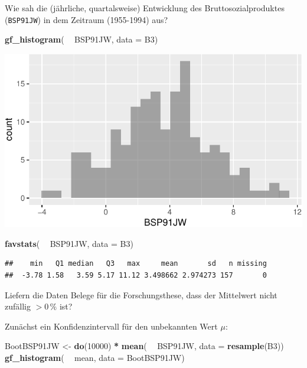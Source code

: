 \documentclass[12pt,ngerman,paper=a4,pagesize,DIV=13]{scrreprt}
\newenvironment{Shaded}{\begin{snugshade}}{\end{snugshade}}
\newcommand{\DataTypeTok}[1]{\textcolor[rgb]{0.13,0.29,0.53}{#1}}
\newcommand{\DecValTok}[1]{\textcolor[rgb]{0.00,0.00,0.81}{#1}}
\newcommand{\KeywordTok}[1]{\textcolor[rgb]{0.13,0.29,0.53}{\textbf{#1}}}
\newcommand{\NormalTok}[1]{#1}
\newcommand{\OperatorTok}[1]{\textcolor[rgb]{0.81,0.36,0.00}{\textbf{#1}}}
\newcommand{\StringTok}[1]{\textcolor[rgb]{0.31,0.60,0.02}{#1}}
\begin{document}
Wie sah die (jährliche, quartalsweise) Entwicklung des
Bruttosozialproduktes (\texttt{BSP91JW}) in dem Zeitraum (1955-1994)
aus?

\begin{Shaded}
\begin{Highlighting}[]
\KeywordTok{gf_histogram}\NormalTok{( }\OperatorTok{~}\StringTok{ }\NormalTok{BSP91JW, }\DataTypeTok{data =}\NormalTok{ B3)}
\end{Highlighting}
\end{Shaded}

\includegraphics{DatenerhebungStatistik-Uebung_files/figure-latex/unnamed-chunk-123-1.pdf}

\begin{Shaded}
\begin{Highlighting}[]
\KeywordTok{favstats}\NormalTok{( }\OperatorTok{~}\StringTok{ }\NormalTok{BSP91JW, }\DataTypeTok{data =}\NormalTok{ B3)}
\end{Highlighting}
\end{Shaded}

\begin{verbatim}
##    min   Q1 median   Q3   max     mean       sd   n missing
##  -3.78 1.58   3.59 5.17 11.12 3.498662 2.974273 157       0
\end{verbatim}

Liefern die Daten Belege für die Forschungsthese, dass der Mittelwert
nicht zufällig \(> 0\,\%\) ist?

Zunächst ein Konfidenzintervall für den unbekannten Wert \(\mu\):

\begin{Shaded}
\begin{Highlighting}[]
\NormalTok{BootBSP91JW <-}\StringTok{ }\KeywordTok{do}\NormalTok{(}\DecValTok{10000}\NormalTok{) }\OperatorTok{*}\StringTok{ }\KeywordTok{mean}\NormalTok{( }\OperatorTok{~}\StringTok{ }\NormalTok{BSP91JW, }\DataTypeTok{data =} \KeywordTok{resample}\NormalTok{(B3))}
\KeywordTok{gf_histogram}\NormalTok{( }\OperatorTok{~}\StringTok{ }\NormalTok{mean, }\DataTypeTok{data =}\NormalTok{ BootBSP91JW)}
\end{Highlighting}
\end{Shaded}
\end{document}
